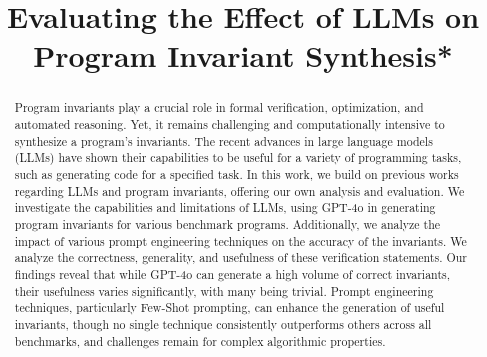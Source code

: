 \documentclass[conference]{IEEEtran}
\begin{document}
\title{Evaluating the Effect of LLMs on Program Invariant Synthesis*\\}

\author{
\and
{}
\and
{}
\and
{}
}

\maketitle

\begin{abstract}
Program invariants play a crucial role in formal verification, optimization, and automated reasoning. Yet, it remains challenging and computationally intensive to synthesize a program’s invariants. The recent advances in large language models (LLMs) have shown their capabilities to be useful for a variety of programming tasks, such as generating code for a specified task. In this work, we build on previous works regarding LLMs and program invariants, offering our own analysis and evaluation. We investigate the capabilities and limitations of LLMs, using GPT-4o in generating program invariants for various benchmark programs. Additionally, we analyze the impact of various prompt engineering techniques on the accuracy of the invariants. We analyze the correctness, generality, and usefulness of these verification statements. Our findings reveal that while GPT-4o can generate a high volume of correct invariants, their usefulness varies significantly, with many being trivial. Prompt engineering techniques, particularly Few-Shot prompting, can enhance the generation of useful invariants, though no single technique consistently outperforms others across all benchmarks, and challenges remain for complex algorithmic properties.
\end{abstract}
\end{document}
